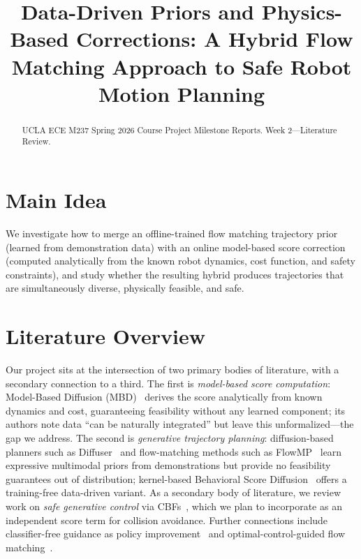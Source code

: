 \documentclass[conference]{IEEEtran}
\begin{document}
\title{Data-Driven Priors and Physics-Based Corrections: A Hybrid Flow
Matching Approach to Safe Robot Motion Planning}

\author{
  \and
}

\maketitle

\begin{abstract}
  UCLA ECE M237 Spring 2026 Course Project Milestone Reports. Week
  2---Literature Review.
\end{abstract}

\section{Main Idea}

We investigate how to merge an offline-trained flow matching trajectory
prior (learned from demonstration data) with an online model-based score
correction (computed analytically from the known robot dynamics, cost
function, and safety constraints), and study whether the resulting
hybrid produces trajectories that are simultaneously diverse, physically
feasible, and safe.

\section{Literature Overview}

Our project sits at the intersection of two primary bodies of
literature, with a secondary connection to a third.
The first is \emph{model-based score computation}: Model-Based
Diffusion (MBD)~\cite{mbd} derives the score analytically from
known dynamics and cost, guaranteeing feasibility without any learned
component; its authors note data ``can be naturally integrated'' but
leave this unformalized---the gap we address.
The second is \emph{generative trajectory planning}: diffusion-based
planners such as Diffuser~\cite{janner2022} and flow-matching
methods such as FlowMP~\cite{flowmp} learn expressive
multimodal priors from demonstrations but provide no feasibility
guarantees out of distribution; kernel-based Behavioral Score
Diffusion~\cite{bsd} offers a training-free data-driven variant.
As a secondary body of literature, we review work on \emph{safe
generative control} via CBFs~\cite{safeflow, s2diff},
which we plan to incorporate as an independent score term for collision
avoidance.  Further connections include classifier-free guidance as
policy improvement~\cite{cfgrl} and optimal-control-guided flow
matching~\cite{ocflow}.
\end{document}
